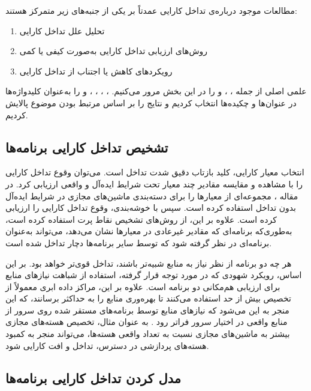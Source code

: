مطالعات موجود درباره‌ی تداخل کارایی عمدتاً بر یکی از جنبه‌های زیر متمرکز هستند:
\begin{enumerate}
\item
تحلیل علل تداخل کارایی
\item
روش‌های ارزیابی تداخل کارایی به‌صورت کیفی یا کمی
\item
رویکردهای کاهش یا اجتناب از تداخل کارایی
\end{enumerate}
علمی اصلی از جمله ، ،  و  را در این بخش مرور می‌کنیم. ، ، ، ،  و  را به‌عنوان کلیدواژه‌ها در عنوان‌ها و چکیده‌ها انتخاب کردیم و نتایج را بر اساس مرتبط بودن موضوع پالایش کردیم.

\subsection{تشخیص تداخل کارایی برنامه‌ها}

انتخاب معیار کارایی، کلید بازتاب دقیق شدت تداخل است. می‌توان وقوع تداخل کارایی را با مشاهده و مقایسه مقادیر چند معیار تحت شرایط ایده‌آل و واقعی ارزیابی کرد. در مقاله \cite{novakovic2013deepdive}، مجموعه‌ای از معیارها را برای دسته‌بندی ماشین‌های مجازی در شرایط ایده‌آل بدون تداخل استفاده کرده است. سپس با خوشه‌بندی، وقوع تداخل کارایی را ارزیابی کرده است. علاوه بر این، \cite{joshi2017sherlock} از روش‌های تشخیص نقاط پرت استفاده کرده است، به‌طوری‌که برنامه‌ای که مقادیر غیرعادی در معیارها نشان می‌دهد، می‌تواند به‌عنوان برنامه‌ای در نظر گرفته شود که توسط سایر برنامه‌ها دچار تداخل شده است.

هر چه دو برنامه از نظر نیاز به منابع شبیه‌تر باشند، تداخل قوی‌تر خواهد بود. بر این اساس، رویکرد شهودی که در \cite{rahimizadeh2021design} مورد توجه قرار گرفته، ‌استفاده از شباهت نیازهای منابع برای ارزیابی هم‌مکانی دو برنامه است. علاوه بر این، مراکز داده ابری معمولاً از تخصیص بیش از حد استفاده می‌کنند تا بهره‌وری منابع را به حداکثر برسانند، که این منجر به این می‌شود که نیازهای منابع توسط برنامه‌های مستقر شده روی سرور از منابع واقعی در اختیار سرور فراتر رود \cite{lang2016overbooking}. به عنوان مثال، تخصیص هسته‌های مجازی  بیشتر به ماشین‌های مجازی نسبت به تعداد واقعی هسته‌ها، می‌تواند منجر به کمبود هسته‌های پردازشی در دسترس، تداخل و افت کارایی شود.

\subsection{مدل کردن تداخل کارایی برنامه‌ها}

